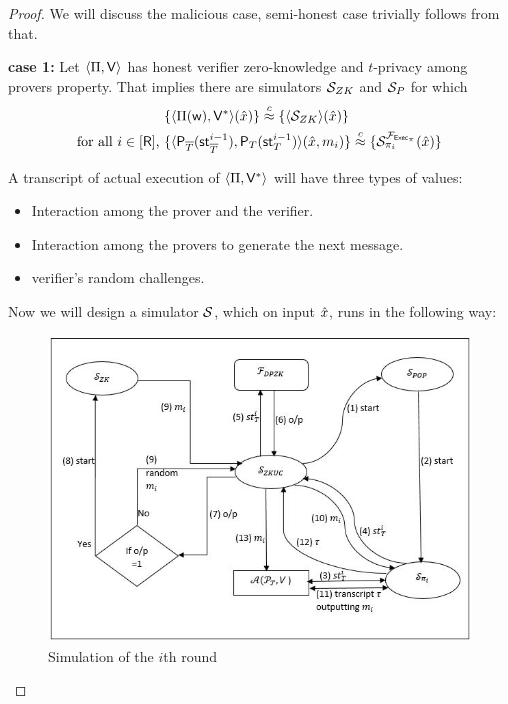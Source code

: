 \begin{proof}
	We will discuss the malicious case, semi-honest case trivially follows from that.
	
	\textbf{case 1:} Let $\langle \Pi,\mathsf{V}\rangle$ has honest verifier zero-knowledge and $t$-privacy among provers property. That implies there are simulators $\mathcal{S}_{ZK}$ and $\mathcal{S}_{P}$ for which 
	\begin{align}
	&\{ \langle  \Pi( \mathsf{w} ) , \mathsf{V}^* \rangle ( \hat{x}) \} \stackrel{c}{\approx} \{ \langle \mathcal{S}_{ZK} \rangle(\hat{x}) \}\\        
	\text{for all }i \in [\mathsf{R}] \text{, } &\{ \langle  \mathsf{P}_{\overline{T}}( \mathsf{st}^{i-1}_{\overline{T}} ) , \mathsf{P}_T ( \mathsf{st}^{i-1}_T ) \rangle ( \hat{x}  , m_i) \}
	\stackrel{c}{\approx} \{  \mathcal{S}_{\pi_i}^{\mathcal{F}_{\mathsf{Exec}_{\pi}}}  (\hat{x}) \}
	\end{align}
	
	A transcript of actual execution of $\langle \Pi,\mathsf{V}^*\rangle$ will have three types of values:
	
	\begin{itemize}
		\item Interaction among the prover and the verifier.
		\item Interaction among the provers to generate the next message.
		\item verifier's random challenges.         
	\end{itemize}
	Now we will design a simulator $\mathcal{S}$, which on input $\hat{x}$, runs in the following way:
	\begin{figure}[H]
		\includegraphics[width=\linewidth]{Diagram1.jpg}
		\caption{Simulation of the $i$th round}
		\label{fig:simulation}
	\end{figure}
	

\end{proof}
